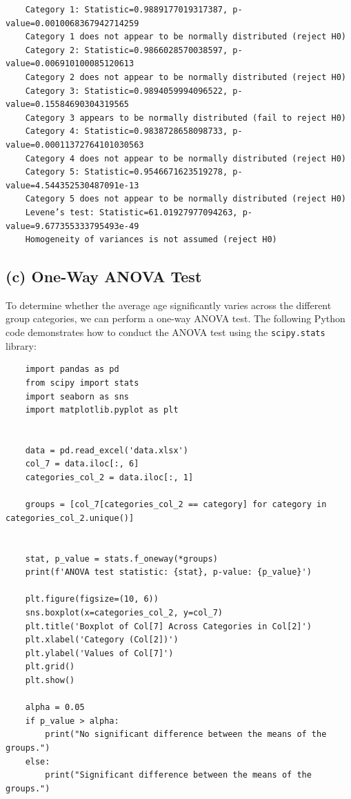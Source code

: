 \documentclass[12pt]{article}
\begin{document}
\begin{verbatim}
    Category 1: Statistic=0.9889177019317387, p-value=0.0010068367942714259
    Category 1 does not appear to be normally distributed (reject H0)
    Category 2: Statistic=0.9866028570038597, p-value=0.006910100085120613
    Category 2 does not appear to be normally distributed (reject H0)
    Category 3: Statistic=0.9894059994096522, p-value=0.15584690304319565
    Category 3 appears to be normally distributed (fail to reject H0)
    Category 4: Statistic=0.9838728658098733, p-value=0.00011372764101030563
    Category 4 does not appear to be normally distributed (reject H0)
    Category 5: Statistic=0.9546671623519278, p-value=4.544352530487091e-13
    Category 5 does not appear to be normally distributed (reject H0)
    Levene’s test: Statistic=61.01927977094263, p-value=9.677355333795493e-49
    Homogeneity of variances is not assumed (reject H0)

\end{verbatim}

\subsection*{(c) One-Way ANOVA Test}

To determine whether the average age significantly varies across the different group categories, we can perform a one-way ANOVA test. The following Python code demonstrates how to conduct the ANOVA test using the \texttt{scipy.stats} library:

\begin{verbatim}
    import pandas as pd
    from scipy import stats
    import seaborn as sns
    import matplotlib.pyplot as plt


    data = pd.read_excel('data.xlsx')
    col_7 = data.iloc[:, 6]
    categories_col_2 = data.iloc[:, 1]

    groups = [col_7[categories_col_2 == category] for category in categories_col_2.unique()]


    stat, p_value = stats.f_oneway(*groups)
    print(f'ANOVA test statistic: {stat}, p-value: {p_value}')

    plt.figure(figsize=(10, 6))
    sns.boxplot(x=categories_col_2, y=col_7)
    plt.title('Boxplot of Col[7] Across Categories in Col[2]')
    plt.xlabel('Category (Col[2])')
    plt.ylabel('Values of Col[7]')
    plt.grid()
    plt.show()

    alpha = 0.05
    if p_value > alpha:
        print("No significant difference between the means of the groups.")
    else:
        print("Significant difference between the means of the groups.")
\end{verbatim}
\end{document}
